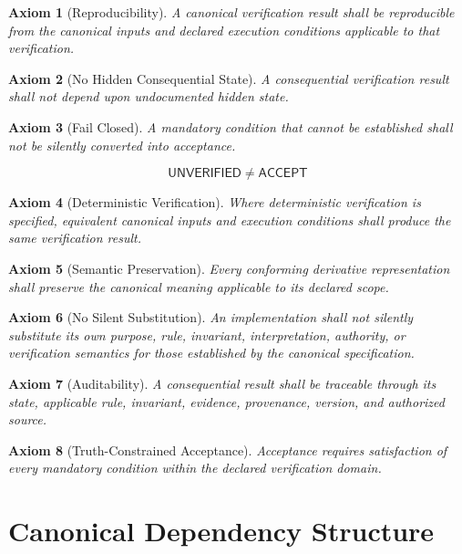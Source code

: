 \documentclass[11pt]{article}
\newcommand{\Accept}{\mathsf{ACCEPT}}
\newcommand{\Unknown}{\mathsf{UNVERIFIED}}
\newtheorem{axiom}{Axiom}
\begin{document}
\begin{axiom}[Reproducibility]
A canonical verification result shall be reproducible from the
canonical inputs and declared execution conditions applicable to
that verification.
\end{axiom}

\begin{axiom}[No Hidden Consequential State]
A consequential verification result shall not depend upon
undocumented hidden state.
\end{axiom}

\begin{axiom}[Fail Closed]
A mandatory condition that cannot be established shall not be
silently converted into acceptance.

\[
\boxed{
\Unknown\neq\Accept
}
\]
\end{axiom}

\begin{axiom}[Deterministic Verification]
Where deterministic verification is specified, equivalent
canonical inputs and execution conditions shall produce the same
verification result.
\end{axiom}

\begin{axiom}[Semantic Preservation]
Every conforming derivative representation shall preserve the
canonical meaning applicable to its declared scope.
\end{axiom}

\begin{axiom}[No Silent Substitution]
An implementation shall not silently substitute its own purpose,
rule, invariant, interpretation, authority, or verification
semantics for those established by the canonical specification.
\end{axiom}

\begin{axiom}[Auditability]
A consequential result shall be traceable through its state,
applicable rule, invariant, evidence, provenance, version, and
authorized source.
\end{axiom}

\begin{axiom}[Truth-Constrained Acceptance]
Acceptance requires satisfaction of every mandatory condition
within the declared verification domain.
\end{axiom}

\section{Canonical Dependency Structure}
\end{document}
